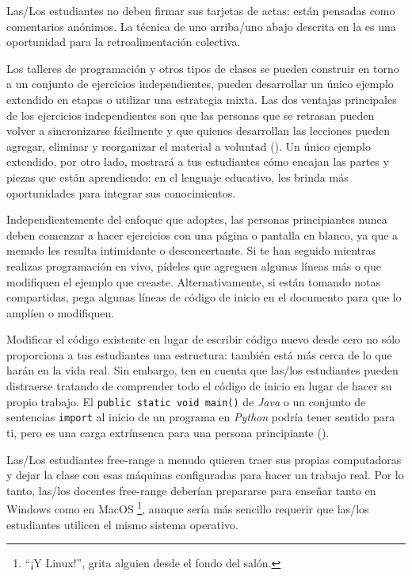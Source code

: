 Las/Los estudiantes no deben firmar sus tarjetas de actas:
están pensadas como comentarios anónimos.
La técnica de uno arriba/uno abajo descrita en la 
es una oportunidad para la retroalimentación colectiva.


Los talleres de programación y otros tipos de clases
se pueden construir en torno a un conjunto de ejercicios independientes,
pueden desarrollar un único ejemplo extendido en etapas
o utilizar una estrategia mixta.
Las dos ventajas principales de los ejercicios independientes son que
las personas que se retrasan pueden volver a sincronizarse fácilmente
y que quienes desarrollan las lecciones pueden agregar, eliminar y reorganizar el material a voluntad
().
Un único ejemplo extendido,
por otro lado,
mostrará a tus estudiantes cómo encajan las partes y piezas que están aprendiendo:
en el lenguaje educativo,
les brinda más oportunidades para integrar sus conocimientos.

Independientemente del enfoque que adoptes,
las personas principiantes nunca deben comenzar a hacer ejercicios con una página o pantalla en blanco,
ya que a menudo les resulta intimidante o desconcertante.
Si te han seguido mientras realizas programación en vivo,
pídeles que agreguen algunas líneas más
o que modifiquen el ejemplo que creaste.
Alternativamente, si están tomando notas compartidas,
pega algunas líneas de código de inicio en el documento
para que lo amplíen o modifiquen.

Modificar el código existente en lugar de escribir código nuevo desde cero
no sólo proporciona a tus estudiantes una estructura:
también está más cerca de lo que harán en la vida real.
Sin embargo,
ten en cuenta que las/los estudiantes pueden distraerse tratando de comprender todo el código de inicio
en lugar de hacer su propio trabajo.
El \texttt{public static void main()} de \emph{Java}
o un conjunto de sentencias \texttt{import} al inicio de un programa en \emph{Python}
podría tener sentido para ti,
pero es una carga extrínsenca para una persona principiante ().


Las/Los estudiantes free-range a menudo quieren traer sus propias computadoras
y dejar la clase con esas máquinas configuradas para hacer un trabajo real.
Por lo tanto, las/los docentes free-range deberían prepararse para enseñar tanto en Windows como en MacOS \footnote{``¡Y Linux!'', grita alguien desde el fondo del salón.},
aunque sería más sencillo requerir que las/los estudiantes utilicen el mismo sistema operativo.

